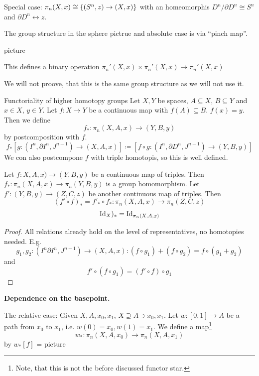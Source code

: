 \documentclass{TemplateLecture}
\begin{document}
Special case: \(\pi_n(X,x) \cong \{(S^n, z) \to (X,x)\}\) with an homeomorphis \(D^n/\partial D^n \cong S^n\) and \(\partial D^n \leftrightarrow z\).

The group structure in the sphere pictrue and absolute case is via \enquote{pinch map}.

picture

This defines a binary operation \(\pi_n'(X,x) \times \pi_n'(X,x) \to \pi_n'(X,x)\)

We will not proove, that this is the same group structure as we will not use it.


\begin{thm}{Functoriality of higher homotopy groups}{}
    Let \(X,Y\) be spaces, \(A \subseteq X\), \(B\subseteq Y\) and \(x \in X\), \(y \in Y\).
    Let \(f\colon X \to Y\) be a continuous map with \(f(A) \subseteq B\). \(f(x) = y\).
    Then we define
    \[f_*\colon \pi_n(X,A,x) \to (Y,B, y)\]
    by postcomposition with \(f\).
    \[f_* [g\colon (I^n, \partial I^n, J^{n-1}) \to (X,A,x)] \coloneq [f\circ g\colon (I^n, \partial D^n, J^{n-1}) \to (Y,B,y)]\]
    We con also postcompone \(f\) with triple homotopis, so this is well defined.
\end{thm}

\begin{lem}{}{}
    Let \(f\colon X,A,x) \to (Y,B,y)\) be a continuous map of triples. Then \(f_*\colon \pi_n(X,A,x) \to \pi_n(Y,B,y)\) is a group homomorphism.
    Let \(f'\colon (Y,B,y) \to (Z,C,z)\) be another continuous map of triples. Then
    \[(f' \circ f)_* = f'_* \circ f_*\colon \pi_n(X,A,x) \to \pi_n(Z,C,z)\]
    \[\mathrm{Id}_X)_* = \mathrm{Id}_{\pi_n(X,A,x)}\]
\end{lem}

\begin{proof}
    All relations already hold on the level of representatives, no homotopies needed.
    E.g.
    \[g_1, g_2\colon (I^n \partial I^n, J^{n-1}) \to (X,A,x) : (f\circ g_1) + (f\circ g_2) = f\circ (g_1 +g_2)\]
    and
    \[f' \circ (f\circ g_1) = (f' \circ f) \circ g_1\]
\end{proof}

\textbf{Dependence on the basepoint.}

The relative case: Given \(X,A, x_0, x_1\), \(X \supseteq A \ni x_0, x_1\). Let \(w\colon [0,1] \to A\) be a path from \(x_0\) to \(x_1\), i.e. \(w(0) = x_0, w(1) = x_1\). We define a map\footnote{Note, that this is not the before discussed functor star.}
\[w_*\colon \pi_n(X,A,x_0) \to \pi_n(X,A,x_1)\]
by \(w_*[f]\) = picture
\end{document}
